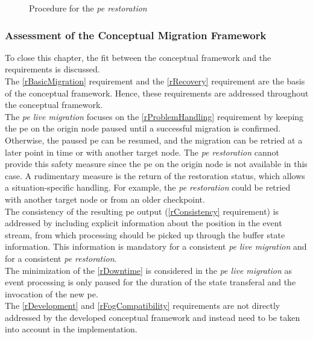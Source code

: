 \begin{figure}[!ht]
\graphicspath{{./figures/code/}}

\caption{Procedure for the \textit{\acrshort{pe} restoration}}
\label{fOSR}
\end{figure}

\subsubsection{Assessment of the Conceptual Migration Framework}
\label{lEvaluationOfMigrationConcept}
To close this chapter, the fit between the conceptual framework and the requirements is discussed.\\
The \ref{rBasicMigration} requirement and the \ref{rRecovery} requirement are the basis of the conceptual framework. Hence, these requirements are addressed throughout the conceptual framework.\\
The \textit{\acrshort{pe} live migration} focuses on the \ref{rProblemHandling} requirement by keeping the \gls{pe} on the origin node paused until a successful migration is confirmed. Otherwise, the paused \gls{pe} can be resumed, and the migration can be retried at a later point in time or with another target node. The \textit{\acrshort{pe} restoration} cannot provide this safety measure since the \gls{pe} on the origin node is not available in this case. A rudimentary measure is the return of the restoration status, which allows a situation-specific handling. For example, the \textit{\acrshort{pe} restoration} could be retried with another target node or from an older checkpoint.\\
The consistency of the resulting \gls{pe} output (\ref{rConsistency} requirement) is addressed by including explicit information about the position in the event stream, from which processing should be picked up through the buffer state information. This information is mandatory for a consistent \textit{\acrshort{pe} live migration} and for a consistent \textit{\acrshort{pe} restoration}.\\
The minimization of the \ref{rDowntime} is considered in the \textit{\acrshort{pe} live migration} as event processing is only paused for the duration of the state transferal and the invocation of the new \gls{pe}.\\
The \ref{rDevelopment} and \ref{rFogCompatibility} requirements are not directly addressed by the developed conceptual framework and instead need to be taken into account in the implementation.
